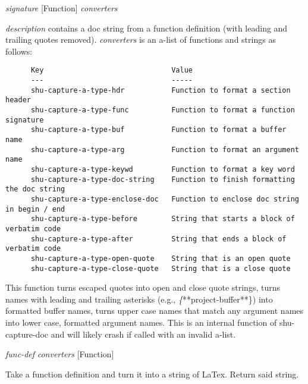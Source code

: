\vspace{1em}
\noindent
{}
\usebox{\funcname}\emph{signature}
 \hfill [Function]
\hspace*{\wd\funcname}\emph{converters}

\begin{doc-string}
\emph{description} contains a doc string from a function definition (with leading
and trailing quotes removed).  \emph{converters} is an a-list of functions and strings as
follows:

\small{\begin{verbatim}
      Key                              Value
      ---                              -----
      shu-capture-a-type-hdr           Function to format a section header
      shu-capture-a-type-func          Function to format a function signature
      shu-capture-a-type-buf           Function to format a buffer name
      shu-capture-a-type-arg           Function to format an argument name
      shu-capture-a-type-keywd         Function to format a key word
      shu-capture-a-type-doc-string    Function to finish formatting the doc string
      shu-capture-a-type-enclose-doc   Function to enclose doc string in begin / end
      shu-capture-a-type-before        String that starts a block of verbatim code
      shu-capture-a-type-after         String that ends a block of verbatim code
      shu-capture-a-type-open-quote    String that is an open quote
      shu-capture-a-type-close-quote   String that is a close quote
\end{verbatim}}

This function turns escaped quotes into open and close quote strings, turns names
with leading and trailing asterisks (e.g., \emph\{**project-buffer**\}) into formatted buffer
names, turns upper case names that match any argument names into lower case,
formatted argument names.  This is an internal function of shu-capture-doc and
will likely crash if called with an invalid a-list.
\end{doc-string}

\vspace{1em}
\noindent
{}
\usebox{\funcname}\emph{func-def} \emph{converters}
 \hfill [Function]
\hspace*{\wd\funcname}

\begin{doc-string}
Take a function definition and turn it into a string of LaTex.  Return said string.
\end{doc-string}

